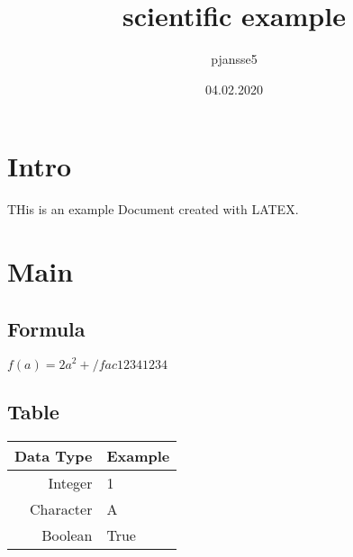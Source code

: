 \documentclass{scrartcl}
\date{04.02.2020}
\author{pjansse5}
\title{scientific example}
\begin{document}
\maketitle
\tableofcontents

\section{Intro}
THis is an example Document created with LATEX.
\section{Main}
\subsection{Formula}
$f(a)=2a^2+/fac{1234}{1234}$
\subsection{Table}
\begin{tabular}[t]{rl}
Data Type & Example\\
\hline
Integer & 1\\
Character & A\\
Boolean & True\\
\end{tabular}
\end{document}
